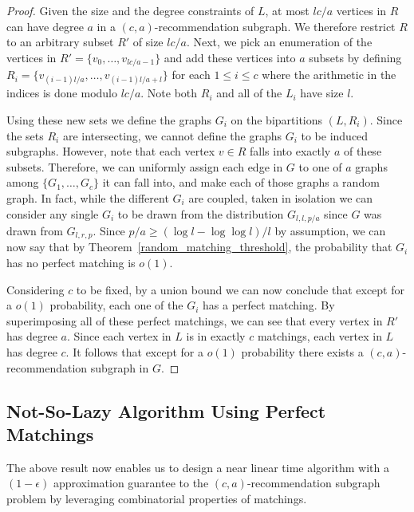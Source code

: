 \begin{proof}
Given the size and the degree constraints of $L$, at most $lc/a$
vertices in $R$ can have degree $a$ in a $(c,a)$-recommendation subgraph. We
therefore restrict $R$ to an arbitrary subset $R'$ of size $lc/a$.
Next, we pick an enumeration of the vertices in $R'=\{v_0,\ldots, v_{lc/a-1}\}$
and add these vertices into $a$ subsets by defining
$R_i = \{v_{(i-1)l/a}, \ldots, v_{(i-1)l/a+l}\}$ for each $1\leq i\leq c$ where
the arithmetic in the indices is done modulo $lc/a$. Note both $R_i$ and all of
the $L_i$ have size $l$. \vs

Using these new sets we define the graphs $G_i$ on the bipartitions
$(L, R_i)$. Since the sets $R_i$ are intersecting, we cannot define the
graphs $G_i$ to be induced subgraphs. However, note that each vertex $v\in R$
falls into exactly $a$ of these subsets. Therefore, we can uniformly assign each
edge in $G$ to one of $a$ graphs among $\{G_1,\ldots, G_c\}$ it can fall into,
and make each of those graphs a random graph. In fact, while the different
$G_i$ are coupled, taken in isolation we can consider any single $G_i$ to be
drawn from the distribution $G_{l,l,p/a}$ since $G$ was drawn from $G_{l,r,p}$.
Since $p/a \geq (\log l - \log\log l)/l$ by assumption, we can now say that by
Theorem~\ref{random_matching_threshold}, the probability that $G_i$ has no perfect
matching is $o(1)$. \vs

Considering $c$ to be fixed, by a union bound we can now conclude that except
for a $o(1)$ probability, each one of the $G_i$ has a perfect matching. By
superimposing all of these perfect matchings, we can see that every vertex in
$R'$ has degree $a$. Since each vertex in $L$ is in exactly $c$ matchings, each
vertex in $L$ has degree $c$. It follows that except for a $o(1)$ probability
 there exists a $(c,a)$-recommendation subgraph in $G$.
\end{proof}

\subsection{Not-So-Lazy Algorithm Using Perfect Matchings}

The above result now enables us to design a near linear time
algorithm with a $(1-\epsilon)$ approximation guarantee
to the $(c,a)$-recommendation subgraph problem by leveraging
combinatorial properties of matchings.

